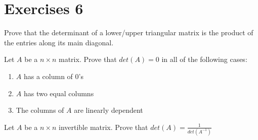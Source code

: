 \section{Exercises 6}
\begin{exercise}
    Prove that the determinant of a lower/upper triangular matrix is the product of the entries along its main diagonal.
\end{exercise}
\begin{exercise}
    Let $A$ be a $n\times n$ matrix. Prove that $det(A)=0$ in all of the following cases:
    \begin{enumerate}
        \item $A$ has a column of $0$'s
        \item $A$ has two equal columns
        \item The columns of $A$ are linearly dependent
    \end{enumerate}
\end{exercise}
\begin{exercise}
    Let $A$ be a $n\times n$ invertible matrix. Prove that $det(A)=\frac{1}{det(A^{-1})}$
\end{exercise}